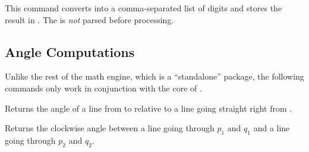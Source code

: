\begin{command}{\pgfmathtodigitlist{}}

	This command converts  into a comma-separated
	list of digits and stores the result in . 
	The  is \emph{not} parsed before processing.
	
\begin{codeexample}[]
\end{codeexample}

\end{command}


\subsection{Angle Computations}

Unlike the rest of the math engine, which is a ``standalone'' package,
the following commands only work in conjunction with the core of
\pgfname.



\begin{command}{\pgfmathanglebetweenpoints{}}
  Returns the angle of a line from  to  relative to a
  line going straight right from .
  
\begin{codeexample}[]
\pgfmathanglebetweenpoints{\pgfpoint{1cm}{3cm}}{\pgfpoint{2cm}{4cm}}
\pgfmathresult
\end{codeexample}
\end{command}

\begin{command}{\pgfmathanglebetweenlines{}}
  Returns the clockwise angle between a line going through $p_1$ and
  $q_1$ and a line going through $p_2$ and $q_2$.
  
\begin{codeexample}[]
\pgfmathanglebetweenlines{\pgfpoint{1cm}{3cm}}{\pgfpoint{2cm}{4cm}}
                         {\pgfpoint{0cm}{1cm}}{\pgfpoint{1cm}{0cm}}  
\pgfmathresult
\end{codeexample}
\end{command}
